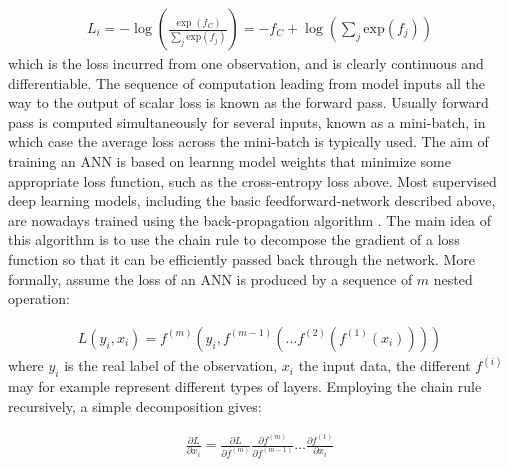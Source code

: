 \documentclass[12pt]{report}
\begin{document}
\begin{align} \label{XEloss}
  L_i  = -\log \left(\frac{\exp (f_C)}{\sum_j \text{exp}(f_j)}\right) = -f_C + \log\left(\sum_j \text{exp}(f_j)\right)
\end{align}
which is the loss incurred from one observation, and is clearly continuous and differentiable. The sequence of computation leading from model inputs all the way to the output of scalar loss is known as the forward pass. Usually forward pass is computed simultaneously for several inputs, known as a mini-batch, in which case the average loss across the mini-batch is typically used. 
The aim of training an ANN is based on learnng model weights that minimize some appropriate loss function, such as the cross-entropy loss above. Most supervised deep learning models, including the basic feedforward-network described above, are nowadays trained using the back-propagation algorithm \cite{Linnainmaa1976} \cite{Rumelhart1985}. The main idea of this algorithm is to use the chain rule to decompose the gradient of a loss function so that it can be efficiently passed back through the network. More formally, assume the loss of an ANN is produced by a sequence of $m$ nested operation:

\begin{align} \label{bp_eq1}
  L(y_i, x_i) = f^{(m)}(y_i, f^{(m-1)}(\dots f^{(2)}(f^{(1)}(x_i))))
\end{align}
where $y_i$ is the real label of the observation, $x_i$ the input data, the different $f^{(i)}$ may for example represent different types of layers. Employing the chain rule recursively, a simple decomposition gives:

\begin{align} \label{bp_crule}
  \frac{\partial L}{\partial x_i} = \frac{\partial L}{\partial f^{(m)}}\frac{\partial f^{(m)}}{\partial f^{(m-1)}} \dots \frac{\partial f^{(1)}}{\partial x_i}
\end{align}
\end{document}
